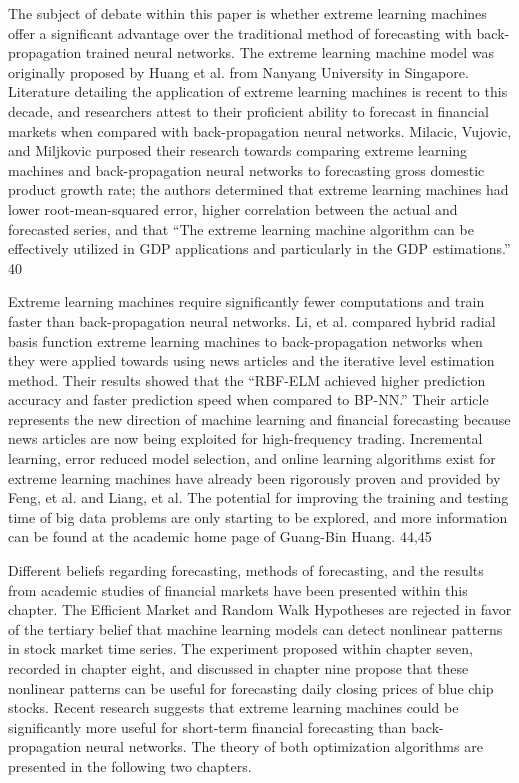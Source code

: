 \documentclass[../main.tex]{subfiles}
\begin{document}
    The subject of debate within this paper is whether extreme learning machines offer a significant advantage over the traditional method of forecasting with back-propagation trained neural networks.
    The extreme learning machine model was originally proposed by Huang et al. from Nanyang University in Singapore.
    Literature detailing the application of extreme learning machines is recent to this decade, and researchers attest to their proficient ability to forecast in financial markets when compared with back-propagation neural networks.
    Milacic, Vujovic, and Miljkovic purposed their research towards comparing extreme learning machines and back-propagation neural networks to forecasting gross domestic product growth rate; the authors determined that extreme learning machines had lower root-mean-squared error, higher correlation between the actual and forecasted series, and that “The extreme learning machine algorithm can be effectively utilized in GDP applications and particularly in the GDP estimations.” 40

    Extreme learning machines require significantly fewer computations and train faster than back-propagation neural networks.
    Li, et al. compared hybrid radial basis function extreme learning machines to back-propagation networks when they were applied towards using news articles and the iterative level estimation method.
    Their results showed that the “RBF-ELM achieved higher prediction accuracy and faster prediction speed when compared to BP-NN.”
    Their article represents the new direction of machine learning and financial forecasting because news articles are now being exploited for high-frequency trading.
    Incremental learning, error reduced model selection, and online learning algorithms exist for extreme learning machines have already been rigorously proven and provided by Feng, et al. and Liang, et al.
    The potential for improving the training and testing time of big data problems are only starting to be explored, and more information can be found at the academic home page of Guang-Bin Huang. 44,45

    Different beliefs regarding forecasting, methods of forecasting, and the results from academic studies of financial markets have been presented within this chapter.
    The Efficient Market and Random Walk Hypotheses are rejected in favor of the tertiary belief that machine learning models can detect nonlinear patterns in stock market time series.
    The experiment proposed within chapter seven, recorded in chapter eight, and discussed in chapter nine propose that these nonlinear patterns can be useful for forecasting daily closing prices of blue chip stocks.
    Recent research suggests that extreme learning machines could be significantly more useful for short-term financial forecasting than back-propagation neural networks.
    The theory of both optimization algorithms are presented in the following two chapters.
\end{document}
